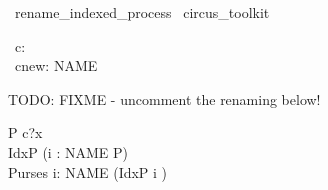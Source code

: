 \begin{zsection}
  \SECTION\ rename\_indexed\_process \parents\ circus\_toolkit
\end{zsection}

\begin{zed}
   [NAME]
\end{zed}

\begin{circus}
     \circchannel\ c: \nat \\
     \circchannel\ cnew: NAME \cross \nat
\end{circus}

TODO: FIXME - uncomment the renaming below!
\begin{circus}
   \circprocess P \circdef \circbegin \circspot c?x \then \Skip \circend \\
   \circprocess IdxP \circdef (i : NAME \circindex P) \\ %
   \circprocess Purses \circdef \Interleave i: NAME \circspot (IdxP \lcircindex i \rcircindex)
\end{circus}

